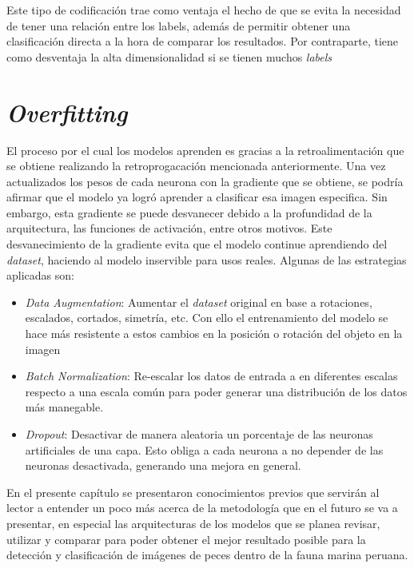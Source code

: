 Este tipo de codificación trae como ventaja el hecho de que se evita la necesidad de tener una relación entre los labels, además de permitir obtener una clasificación directa a la hora de comparar los resultados. Por contraparte, tiene como desventaja la alta dimensionalidad si se tienen muchos \textit{labels}



\section{\textit{Overfitting}}
El proceso por el cual los modelos aprenden es gracias a la retroalimentación que se obtiene realizando la retroprogacación mencionada anteriormente. Una vez actualizados los pesos de cada neurona con la gradiente que se obtiene, se podría afirmar que el modelo ya logró aprender a clasificar esa imagen especifica. Sin embargo, esta gradiente se puede desvanecer debido a la profundidad de la arquitectura, las funciones de activación, entre otros motivos. Este desvanecimiento de la gradiente evita que el modelo continue aprendiendo del \textit{dataset}, haciendo al modelo inservible para usos reales. Algunas de las estrategias aplicadas son: 

\begin{itemize}
    \item {\textit{Data Augmentation}: Aumentar el \textit{dataset} original en base a rotaciones, escalados, cortados, simetría, etc. Con ello el entrenamiento del modelo se hace más resistente a estos cambios en la posición o rotación del objeto en la imagen }
    \item {\textit{Batch Normalization}: Re-escalar los datos de entrada a en diferentes escalas respecto a una escala común para poder generar una distribución de los datos más manegable.}
    \item {\textit{Dropout}: Desactivar de manera aleatoria un porcentaje de las neuronas artificiales de una capa. Esto obliga a cada neurona a no depender de las neuronas desactivada, generando una mejora en general.}
\end{itemize}

En el presente capítulo se presentaron conocimientos previos que servirán al lector a entender un poco más acerca de la metodología que en el futuro se va a presentar, en especial las arquitecturas de los modelos que se planea revisar, utilizar y comparar para poder obtener el mejor resultado posible para la detección y clasificación de imágenes de peces dentro de la fauna marina peruana. 

